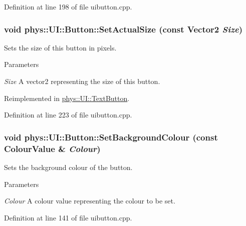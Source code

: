 Definition at line 198 of file uibutton.cpp.

\hypertarget{classphys_1_1UI_1_1Button_a7ac62ddb9f40a701e80a4eccacdc7ea0}{
\subsubsection[{SetActualSize}]{\setlength{\rightskip}{0pt plus 5cm}void phys::UI::Button::SetActualSize (const {\bf Vector2} {\em Size})}}
\label{d8/d88/classphys_1_1UI_1_1Button_a7ac62ddb9f40a701e80a4eccacdc7ea0}


Sets the size of this button in pixels. 


\begin{DoxyParams}{Parameters}
\item[{\em Size}]A vector2 representing the size of this button. \end{DoxyParams}


Reimplemented in \hyperlink{classphys_1_1UI_1_1TextButton_a7ed2be5c895c7fe01d7650746ccc57e9}{phys::UI::TextButton}.



Definition at line 223 of file uibutton.cpp.

\hypertarget{classphys_1_1UI_1_1Button_a390aa5a409361507b5802141380bc1d3}{
\subsubsection[{SetBackgroundColour}]{\setlength{\rightskip}{0pt plus 5cm}void phys::UI::Button::SetBackgroundColour (const {\bf ColourValue} \& {\em Colour})}}
\label{d8/d88/classphys_1_1UI_1_1Button_a390aa5a409361507b5802141380bc1d3}


Sets the background colour of the button. 


\begin{DoxyParams}{Parameters}
\item[{\em Colour}]A colour value representing the colour to be set. \end{DoxyParams}


Definition at line 141 of file uibutton.cpp.

